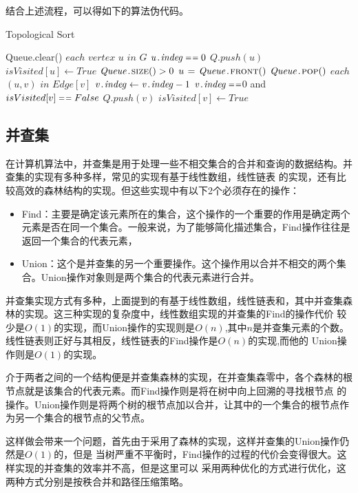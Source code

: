 结合上述流程，可以得如下的算法伪代码。
\begin{algorithm} 
\caption {Topological Sort} 
\begin{codebox}
\li Queue.clear()
\li \For $each$ $vertex $ $u$ $in$ $G$
\li	\Do \If $\attribii{u}{indeg}  \isequal 0$
\li		\Then	$Q.push(u)$	
\li				$isVisited[u] \leftarrow True$
		\End
	\End
\li \While $\attribii{Queue}{\proc{size}()} > 0$
\li	\Do	$u \gets \attribii{Queue}{\proc{front}()}$
\li		$\attribii{Queue}{\proc{pop}()}$
\li		\For $each$ $(u,v)$ $in$ $ Edge[v]$
\li			\Do	$ \attribii{v}{indeg} \leftarrow  \attribii{v}{indeg} - 1$
\li			\If $\attribii{v}{indeg}  \isequal $0 and $isVisited[v] \isequal False$
\li				\Then	$Q.push(v)$
\li						$isVisited[v] \leftarrow True$
				\End
	\End
   \End
\end{codebox}
\end{algorithm} 
\subsection{并查集}
在计算机算法中，并查集\cite{ref19}是用于处理一些不相交集合的合并和查询的数据结构。并查集的实现有多种多样，常见的实现有基于线性数组，线性链表
的实现，还有比较高效的森林结构的实现。但这些实现中有以下2个必须存在的操作：
\begin{itemize}
\item Find：主要是确定该元素所在的集合，这个操作的一个重要的作用是确定两个元素是否在同一个集合。一般来说，为了能够简化描述集合，Find操作往往是返回一个集合的代表元素，
\item Union：这个是并查集的另一个重要操作。这个操作用以合并不相交的两个集合。Union操作对象则是两个集合的代表元素进行合并。
\end{itemize}

并查集实现方式有多种，上面提到的有基于线性数组，线性链表和，其中并查集森林的实现。这三种实现的复杂度中，线性数组实现的并查集的Find的操作代价
较少是$O(1)$的实现，而Union操作的实现则是$O(n)$,其中$n$是并查集元素的个数。线性链表则正好与其相反，线性链表的Find操作是$O(n)$的实现,而他的
Union操作则是$O(1)$的实现。

介于两者之间的一个结构便是并查集森林的实现，在并查集森零中，各个森林的根节点就是该集合的代表元素。而Find操作则是将在树中向上回溯的寻找根节点
的操作。Union操作则是将两个树的根节点加以合并，让其中的一个集合的根节点作为另一个集合的根节点的父节点。

这样做会带来一个问题，首先由于采用了森林的实现，这样并查集的Union操作仍然是$O(1)$的，但是
当树严重不平衡时，Find操作的过程的代价会变得很大。这样实现的并查集的效率并不高，但是这里可以
采用两种优化的方式进行优化，这两种方式分别是按秩合并和路径压缩策略。


